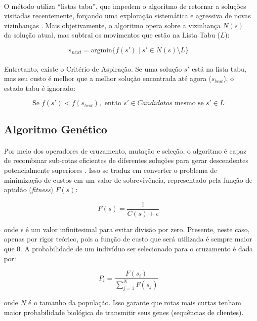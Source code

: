 \paragraph{} O método utiliza ``listas tabu'', que impedem o algoritmo de retornar a soluções visitadas recentemente, forçando uma exploração sistemática e agressiva de novas vizinhanças \cite{Glover89}. Mais objetivamente, o algoritmo opera sobre a vizinhança $N(s)$ da solução atual, mas subtrai os movimentos que estão na Lista Tabu ($L$):

$$s_{next} = \text{argmin} \{f(s') \mid s' \in N(s) \setminus L\}$$

\paragraph{}Entretanto, existe o Critério de Aspiração. Se uma solução $s'$ está na lista tabu, mas seu custo é melhor que a melhor solução encontrada até agora ($s_{best}$), o estado tabu é ignorado:

$$\text{Se } f(s') < f(s_{best}), \text{ então } s' \in \textit{Candidatos} \text{ mesmo se } s' \in L$$

\subsection{Algoritmo Genético}
\label{sec:ga}

\paragraph{} Por meio dos operadores de cruzamento, mutação e seleção, o algoritmo é capaz de recombinar sub-rotas eficientes de diferentes soluções para gerar descendentes potencialmente superiores \cite{Holland75, Goldberg89}. Isso se traduz em converter o problema de minimização de custos em um valor de sobrevivência, representado pela função de aptidão (\textit{fitness}) $F(s)$:

$$F(s) = \frac{1}{C(s) + \epsilon}$$

\vspace{0.5cm}
\noindent onde $\epsilon$ é um valor infinitesimal para evitar divisão por zero. Presente, neste caso, apenas por rigor teórico, pois a função de custo que será utilizada é sempre maior que 0. A probabilidade de um indivíduo ser selecionado para o cruzamento é dada por:

$$P_i = \frac{F(s_i)}{\sum_{j=1}^{N} F(s_j)}$$

\vspace{0.5cm}
\noindent onde $N$ é o tamanho da população. Isso garante que rotas mais curtas tenham maior probabilidade biológica de transmitir seus genes (sequências de clientes).


